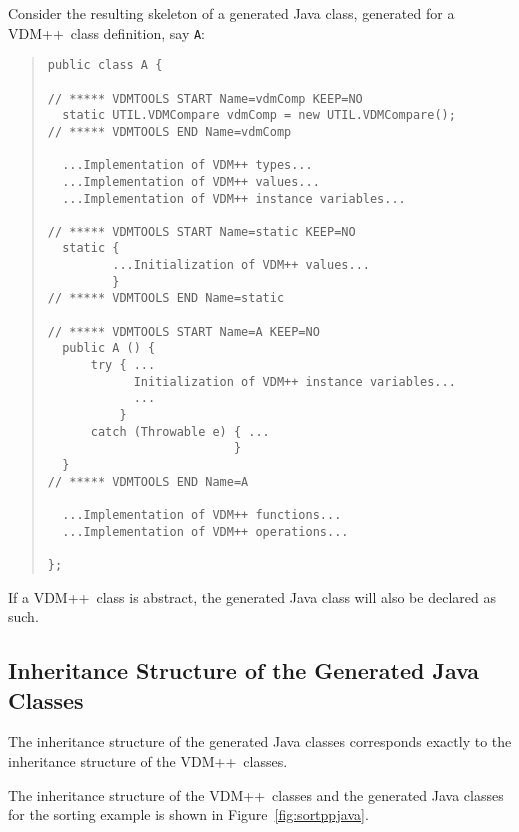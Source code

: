 \documentclass[\pformat,11pt]{article}
\newcommand{\VDM}{VDM++}
\begin{document}
Consider the resulting skeleton of a generated Java class, generated
for a \VDM\ class definition, say {\tt A}: 

\begin{quote}
\begin{verbatim}
public class A {

// ***** VDMTOOLS START Name=vdmComp KEEP=NO
  static UTIL.VDMCompare vdmComp = new UTIL.VDMCompare();
// ***** VDMTOOLS END Name=vdmComp

  ...Implementation of VDM++ types...
  ...Implementation of VDM++ values... 
  ...Implementation of VDM++ instance variables... 

// ***** VDMTOOLS START Name=static KEEP=NO
  static {
         ...Initialization of VDM++ values...
         }
// ***** VDMTOOLS END Name=static

// ***** VDMTOOLS START Name=A KEEP=NO
  public A () { 
      try { ...
            Initialization of VDM++ instance variables...
            ...
          }
      catch (Throwable e) { ...
                          }
  }
// ***** VDMTOOLS END Name=A

  ...Implementation of VDM++ functions... 
  ...Implementation of VDM++ operations... 

};
\end{verbatim}
\end{quote}

If a \VDM\ class is abstract, the generated Java class
will also be declared as such. 

\subsection{Inheritance Structure of the Generated Java Classes}
\label{inheritance}
The inheritance structure of the generated Java classes corresponds
exactly to the inheritance structure of the \VDM\ classes. 

The inheritance structure of the \VDM\ classes and the generated Java
classes for the sorting example is shown in
Figure~\ref{fig:sortppjava}.
\end{document}
